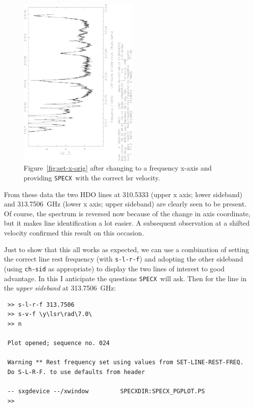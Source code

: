 \documentclass[11pt,twoside]{article}
\newcommand{\SPECX}{{\tt SPECX}}
\begin{document}
\begin{figure}[ht]
\begin{minipage}[t]{\textwidth}
\begin{minipage}[b]{0.5\textwidth}
\includegraphics[angle=-90,width=2.3in]{sc8_hdo_freq.ps}
\centering
\end{minipage}
\hfill
\begin{minipage}[b]{0.45\textwidth}
\caption[A messy spectrum with reasonable axes]
{\small{Figure~\ref{fig:set-x-orig} after changing to a frequency
x-axis and providing \SPECX\ with the correct lsr velocity.
\vspace*{1cm}
}}
\label{fig:set-x-to-freq}
\end{minipage}
\end{minipage}
\end{figure}
   
From these data the two HDO lines at 310.5333 (upper x axis; lower
sideband) and 313.7506~GHz (lower x axis; upper sideband) are clearly
seen to be present. Of course, the spectrum is reversed now because of
the change in axis coordinate, but it makes line identification a lot
easier. A subsequent observation at a shifted velocity confirmed this
result on this occasion.

Just to show that this all works as expected, we can use a combination
of setting the correct line rest frequency (with {\tt s-l-r-f}) and
adopting the other sideband (using {\tt ch-sid} as appropriate) to display
the two
lines of interest to good advantage. In this I anticipate the
questions \SPECX\ will ask. Then for the line in the {\it upper sideband}
at
313.7506~GHz:
\begin{verbatim}
 >> s-l-r-f 313.7506
 >> s-v-f \y\lsr\rad\7.0\ 
 >> n
 
 Plot opened; sequence no. 024
 
 Warning ** Rest frequency set using values from SET-LINE-REST-FREQ.
 Do S-L-R-F. to use defaults from header
 
 -- sxgdevice --/xwindow         SPECXDIR:SPECX_PGPLOT.PS
 >> 
\end{verbatim} 
\end{document}
